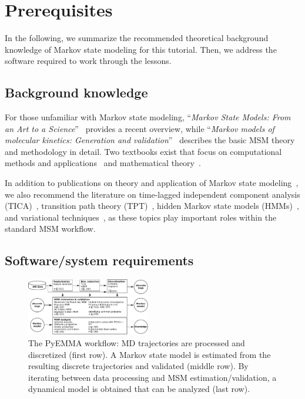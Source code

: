\documentclass[9pt,tutorial]{livecoms}
\begin{document}
\section{Prerequisites}

In the following, we summarize the recommended theoretical background knowledge of Markov state modeling for this tutorial.
Then, we address the software required to work through the lessons.

\subsection{Background knowledge}
\label{sec:background}

For those unfamiliar with Markov state modeling, ``\emph{Markov State Models: From an Art to a Science}''~\cite{msm-brooke} provides a recent overview, while ``\emph{Markov models of molecular kinetics: Generation and validation}''~\cite{msm-jhp} describes the basic MSM theory and methodology in detail. Two textbooks exist that focus on computational methods and applications~\cite{msm-book} and mathematical theory~\cite{schuette-sarich-book}.

In addition to publications on theory and application of Markov state modeling~\cite{schuette-msm,buchete-msm-2008,noe-tmat-sampling,bowman-msm-2009,noe-folding-pathways,sarich-msm-quality,noe-fingerprints,noe-dy-neut-scatt,Chodera2014,ben-rev-msm,simon-mech-mod-nmr,oom-feliks},
we also recommend the literature on time-lagged independent component analysis (TICA)~\cite{tica,tica3,tica2,kinetic-maps}, transition path theory (TPT)~\cite{weinan-tpt,metzner-msm-tpt},
hidden Markov state models (HMMs)~\cite{noe-proj-hid-msm,hmm-baum-welch-alg,hmm-tutorial}, and variational techniques~\cite{noe-vac,vamp-preprint,gmrq}, as these topics play important roles within the standard MSM workflow.

\subsection{Software/system requirements}

\begin{figure}
\includegraphics[width=0.48\textwidth]{figure_1}
\caption{The PyEMMA workflow: MD trajectories are processed and discretized (first row). A Markov state model is estimated from the resulting discrete trajectories and validated (middle row). By iterating between data processing and MSM estimation/validation, a dynamical model is obtained that can be analyzed (last row).}
\label{fig:workflowchart}
\end{figure}
\end{document}
